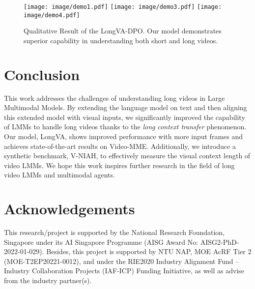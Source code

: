 \begin{figure}[htp]
    \centering
    \texttt{[image: image/demo1.pdf]}
    \texttt{[image: image/demo3.pdf]}
    \texttt{[image: image/demo4.pdf]}
    \caption{Qualitative Result of the LongVA-DPO. Our model demonstrates superior capability in understanding both short and long videos. 
    }
    \vspace{-10pt}
    \label{fig:demo}
\end{figure}

\section{Conclusion}

This work addresses the challenges of understanding long videos in Large Multimodal Models. By extending the language model on text and then aligning this extended model with visual inputs, we significantly improved the capability of LMMs to handle long videos thanks to the \textit{long context transfer} phenomenon. Our model, LongVA, shows improved performance with more input frames and achieves state-of-the-art results on Video-MME. Additionally, we introduce a synthetic benchmark, V-NIAH, to effectively measure the visual context length of video LMMs.  We hope this work inspires further research in the field of long video LMMs and multimodal agents.\section{Acknowledgements}
This research/project is supported by the National Research Foundation, Singapore under its AI Singapore Programme (AISG Award No: AISG2-PhD-2022-01-029). Besides, this project is supported by NTU NAP, MOE AcRF Tier 2 (MOE-T2EP20221-0012), and under the RIE2020 Industry Alignment Fund – Industry Collaboration Projects (IAF-ICP) Funding Initiative, as well as advise from the industry partner(s).

